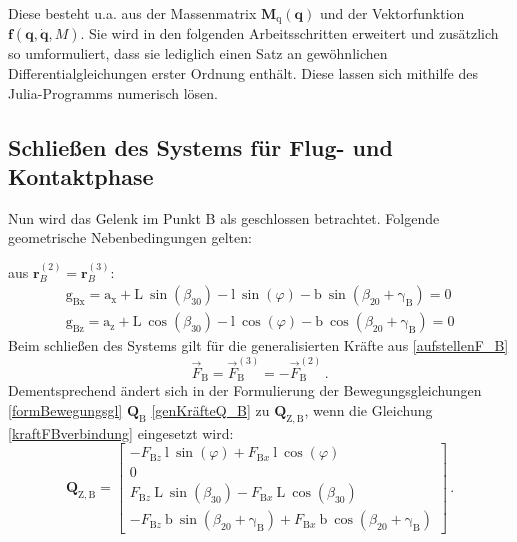 \documentclass[]{scrartcl}
\begin{document}
Diese besteht u.a. aus der Massenmatrix $\mathbf{M}_{\mathrm{q}}(\mathbf{q})$ und der Vektorfunktion $\mathbf{f}(\mathbf{q}, \dot{\mathbf{q}}, M)$. Sie wird in den folgenden Arbeitsschritten erweitert und zusätzlich so umformuliert, dass sie lediglich einen Satz an gewöhnlichen Differentialgleichungen erster Ordnung enthält. Diese lassen sich mithilfe des Julia-Programms numerisch lösen.

\subsection{Schließen des Systems für Flug- und Kontaktphase}
Nun wird das Gelenk im Punkt B als geschlossen betrachtet. Folgende geometrische Nebenbedingungen gelten:


aus $\boldsymbol{r}_{B}^{(2)} = \boldsymbol{r}_{B}^{(3)}$:
\begin{align}
{\mathrm{g_{Bx}}} = \mathrm{a_x} + \mathrm{L} ~ \sin(\beta_{30}) - \mathrm{l} ~ \sin(\varphi) - \mathrm{b} ~ \sin(\beta_{20} + \mathrm{\gamma_B}) = 0
\label{bedingungGelenkBx}
\\
{\mathrm{g_{Bz}}} = \mathrm{a_z} + \mathrm{L} ~ \cos(\beta_{30}) - \mathrm{l} ~ \cos(\varphi) - \mathrm{b} ~ \cos(\beta_{20} + \mathrm{\gamma_B}) = 0
\label{bedingungGelenkBz}
\end{align}
Beim schließen des Systems gilt für die generalisierten Kräfte aus \eqref{aufstellenF_B}
\begin{equation}
	\vec{F}_{\mathrm{B}} = \vec{F}_{\mathrm{B}}^{(3)} = -\vec{F}_{\mathrm{B}}^{(2)} \, .
	\label{kraftFBverbindung}
\end{equation}
Dementsprechend ändert sich in der Formulierung der Bewegungsgleichungen \eqref{formBewegungsgl} $\mathbf{Q}_{\mathrm{B}}$ \eqref{genKräfteQ_B} zu $\mathbf{Q}_{\mathrm{Z,B}}$, wenn die Gleichung \eqref{kraftFBverbindung} eingesetzt wird:
\begin{equation}
	\mathbf{Q}_{\mathrm{Z,B}} = 
	\begin{bmatrix}
		-F_{\mathrm{B}z} ~ \mathrm{l} ~ \sin(\varphi) + F_{\mathrm{B}x} ~ \mathrm{l} ~ \cos(\varphi)\\
		0 \\
		F_{\mathrm{B}z} ~ \mathrm{L} ~ \sin(\beta_{30}) - F_{\mathrm{B}x} ~ \mathrm{L} ~ \cos(\beta_{30}) \\
		-F_{\mathrm{B}z} ~ \mathrm{b} ~ \sin(\beta_{20} + \mathrm{\gamma_B}) + F_{\mathrm{B}x} ~ \mathrm{b} ~ \cos(\beta_{20} + \mathrm{\gamma_B})
	\end{bmatrix} \, .
\end{equation}
\end{document}
